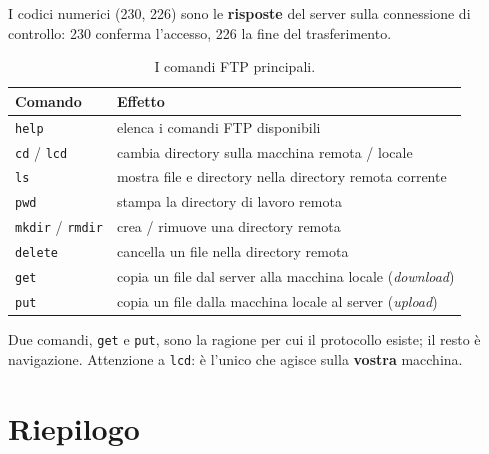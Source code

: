 I codici numerici (230, 226) sono le \textbf{risposte} del server sulla connessione di controllo: 230 conferma
l'accesso, 226 la fine del trasferimento.


\begin{table}[H]
\centering
\begin{tabular}{ll}
\toprule
\textbf{Comando} & \textbf{Effetto} \\
\midrule
\texttt{help} & elenca i comandi FTP disponibili \\
\texttt{cd} / \texttt{lcd} & cambia directory sulla macchina remota / locale \\
\texttt{ls} & mostra file e directory nella directory remota corrente \\
\texttt{pwd} & stampa la directory di lavoro remota \\
\texttt{mkdir} / \texttt{rmdir} & crea / rimuove una directory remota \\
\texttt{delete} & cancella un file nella directory remota \\
\texttt{get} & copia un file dal server alla macchina locale (\emph{download}) \\
\texttt{put} & copia un file dalla macchina locale al server (\emph{upload}) \\
\bottomrule
\end{tabular}
\caption{I comandi FTP principali.}
\end{table}

Due comandi, \texttt{get} e \texttt{put}, sono la ragione per cui il protocollo esiste; il resto è navigazione.
Attenzione a \texttt{lcd}: è l'unico che agisce sulla \textbf{vostra} macchina.

\section{Riepilogo}

